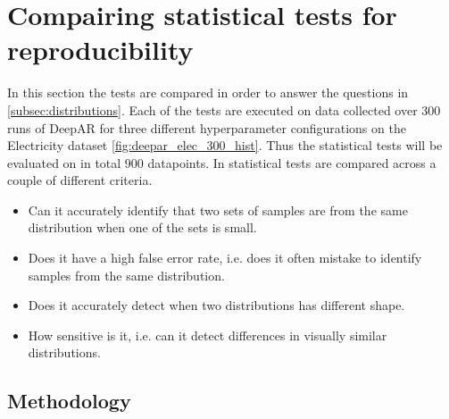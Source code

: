 \section{Compairing statistical tests for reproducibility}
\label{subsubsec:choosing-statistical-test}
In this section the tests are compared in order to answer the questions in \ref{subsec:distributions}. Each of the tests are executed on data collected over 300 runs of DeepAR for three different hyperparameter configurations on the Electricity dataset \ref{fig:deepar_elec_300_hist}. Thus the statistical tests will be evaluated on in total 900 datapoints. In statistical tests are compared across a couple of different criteria.

\begin{itemize}
  \item Can it accurately identify that two sets of samples are from the same distribution when one of the sets is small.
  \item Does it have a high false error rate, i.e. does it often mistake to identify samples from the same distribution.
  \item Does it accurately detect when two distributions has different shape.
  \item How sensitive is it, i.e. can it detect differences in visually similar distributions.
\end{itemize}

\subsection{Methodology}

